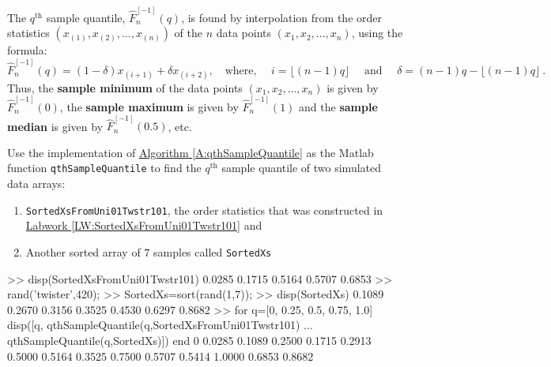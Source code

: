 The $q^{\text{th}}$ sample quantile, $ \widehat{F}_n^{[-1]}(q)$, is found by interpolation from the order statistics $(x_{(1)},x_{(2)},\ldots,x_{(n)})$ of the $n$ data points $(x_1,x_2,\ldots,x_n)$, using the formula:
\[
 \widehat{F}_n^{[-1]}(q) = (1 - \delta) x_{(i+1)} + \delta x_{(i+2)}, \quad \text{where, }
\quad i = \lfloor (n-1) q \rfloor  \quad \text{ and }
\quad \delta = (n-1) q -  \lfloor (n-1) q \rfloor \ .
\]
Thus, the {\bf sample minimum} of the data points $(x_1,x_2,\ldots,x_n)$ is given by $ \widehat{F}_n^{[-1]}(0)$, the {\bf sample maximum} is given by $ \widehat{F}_n^{[-1]}(1)$ and the {\bf sample median} is given by $ \widehat{F}_n^{[-1]}(0.5)$, etc.
\begin{labwork}\label{LW:qthSampleQuantile}
Use the implementation of \hyperref[A:qthSampleQuantile]{Algorithm \ref*{A:qthSampleQuantile}} %
as the {\sc Matlab} function {\tt qthSampleQuantile} to find the $q^{\text{th}}$ sample quantile of two simulated data arrays:
\begin{enumerate}
\item {\tt SortedXsFromUni01Twstr101}, the order statistics that was constructed in \hyperref[LW:SortedXsFromUni01Twstr101]{Labwork \ref*{LW:SortedXsFromUni01Twstr101}} and
\item Another sorted array of $7$ samples called {\tt SortedXs}
\end{enumerate}
\begin{VrbM}
>> disp(SortedXsFromUni01Twstr101)
    0.0285    0.1715    0.5164    0.5707    0.6853
>> rand('twister',420);
>> SortedXs=sort(rand(1,7));
>> disp(SortedXs)
    0.1089    0.2670    0.3156    0.3525    0.4530    0.6297    0.8682
>> for q=[0, 0.25, 0.5, 0.75, 1.0]
       disp([q, qthSampleQuantile(q,SortedXsFromUni01Twstr101) ...
                qthSampleQuantile(q,SortedXs)])
   end
         0    0.0285    0.1089
    0.2500    0.1715    0.2913
    0.5000    0.5164    0.3525
    0.7500    0.5707    0.5414
    1.0000    0.6853    0.8682
\end{VrbM}
\end{labwork}


